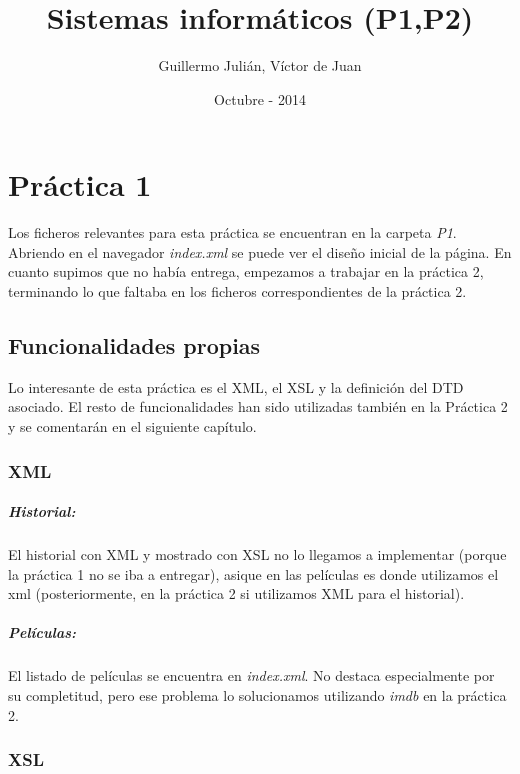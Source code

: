 \documentclass{apuntes}
\title{Sistemas informáticos (P1,P2)}
\author{Guillermo Julián, Víctor de Juan}
\date{Octubre - 2014}
\begin{document}
\pagestyle{plain}
\maketitle

\tableofcontents
\newpage

\chapter{Práctica 1}

Los ficheros relevantes para esta práctica se encuentran en la carpeta \textit{P1}. Abriendo en el navegador \textit{index.xml} se puede ver el diseño inicial de la página. En cuanto supimos que no había entrega, empezamos a trabajar en la práctica 2, terminando lo que faltaba en los ficheros correspondientes de la práctica 2.

\section{Funcionalidades propias}
Lo interesante de esta práctica es el XML, el XSL y la definición del DTD asociado. El resto de funcionalidades han sido utilizadas también en la Práctica 2 y se comentarán en el siguiente capítulo.


\subsection{XML}

\paragraph{Historial: }
El historial con XML y mostrado con XSL no lo llegamos a implementar (porque la práctica 1 no se iba a entregar), asique en las películas es donde utilizamos el xml (posteriormente, en la práctica 2 si utilizamos XML para el historial).

\paragraph{Películas: }
El listado de películas se encuentra en \textit{index.xml}. No destaca especialmente por su completitud, pero ese problema lo solucionamos utilizando \textit{imdb} en la práctica 2. 

\subsection{XSL} 
\end{document}
